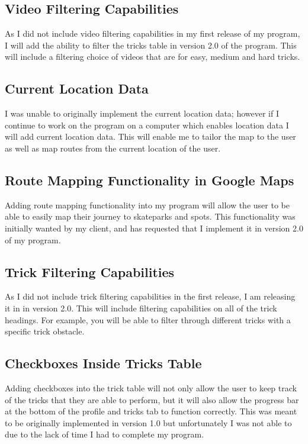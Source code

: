 	\subsection{Video Filtering Capabilities}

As I did not include video filtering capabilities in my first release of my program, I will add the ability to filter the tricks table in version 2.0 of the program. This will include a filtering choice of videos that are for easy, medium and hard tricks.


	\subsection{Current Location Data}

I was unable to originally implement the current location data; however if I continue to work on the program on a computer which enables location data I will add current location data. This will enable me to tailor the map to the user as well as map routes from the current location of the user.

	\subsection{Route Mapping Functionality in Google Maps}

Adding route mapping functionality into my program will allow the user to be able to easily map their journey to skateparks and spots. This functionality was initially wanted by my client, and has requested that I implement it in version 2.0 of my program.

	\subsection{Trick Filtering Capabilities}

As I did not include trick filtering capabilities in the first release, I am releasing it in in version 2.0. This will include filtering capabilities on all of the trick headings. For example, you will be able to filter through different tricks with a specific trick obstacle.

	\subsection{Checkboxes Inside Tricks Table}

Adding checkboxes into the trick table will not only allow the user to keep track of the tricks that they are able to perform, but it will also allow the progress bar at the bottom of the profile and tricks tab to function correctly. This was meant to be originally implemented in version 1.0 but unfortunately I was not able to due to the lack of time I had to complete my program.

